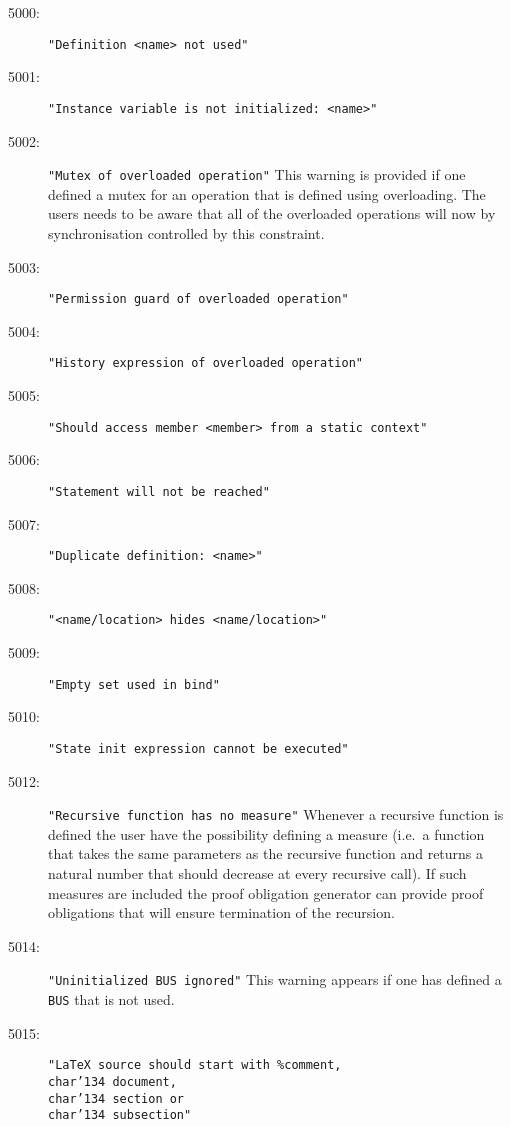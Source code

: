 %
%
%

\begin{description}
\item[5000:] \texttt{"Definition <name> not used"}
\item[5001:] \texttt{"Instance variable is not initialized:\ <name>"}
\item[5002:] \texttt{"Mutex of overloaded operation"} This warning is
  provided if one defined a mutex for an operation that is defined
  using overloading. The users needs to be aware that all of the
  overloaded operations will now by synchronisation controlled by this
  constraint. 
\item[5003:] \texttt{"Permission guard of overloaded operation"}
\item[5004:] \texttt{"History expression of overloaded operation"}
\item[5005:] \texttt{"Should access member <member> from a static context"}
\item[5006:] \texttt{"Statement will not be reached"}
\item[5007:] \texttt{"Duplicate definition:\ <name>"}
\item[5008:] \texttt{"<name/location> hides <name/location>"}
\item[5009:] \texttt{"Empty set used in bind"}
\item[5010:] \texttt{"State init expression cannot be executed"}
\item[5012:] \texttt{"Recursive function has no measure"} Whenever a
  recursive function is defined the user have the possibility defining
  a measure (i.e.\ a function that takes the same parameters as the
  recursive function and returns a natural number that should decrease
  at every recursive call). If such measures are included the proof
  obligation generator can provide proof obligations that will ensure
  termination of the recursion.
\item[5014:] \texttt{"Uninitialized BUS ignored"}  This warning appears
  if one has defined a \texttt{BUS} that is not used.
\item[5015:] \texttt{"LaTeX source should start with \%comment,
  \\char'134 document, \\char'134 section or \\char'134 subsection"  }
\end{description}

